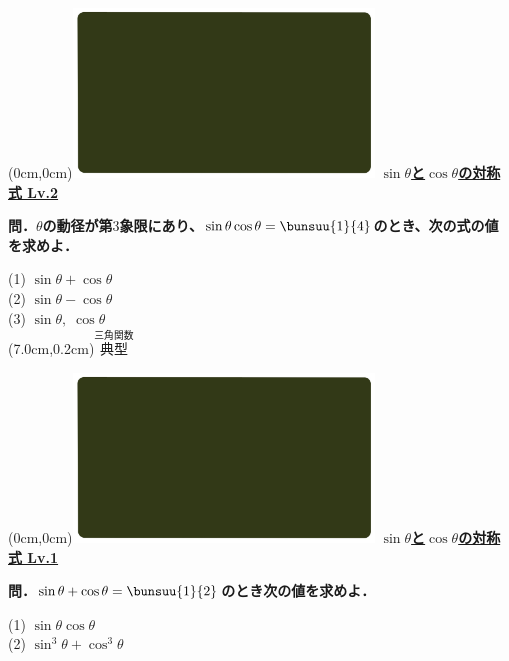 \documentclass[10pt,
fleqn,
dvipdfmx,
uplatex
]{jsarticle}
\begin{document}
\newpage



\at(0cm,0cm){\includegraphics[width=8cm,bb=0 0 1920 1080]{./youtube/thumbnails/templates/smart_background/三角関数.jpeg}}
{\color{orange}\bf\boldmath\Large\underline{$\sin \theta$と$\cos \theta$の対称式 Lv.2}}\vspace{0.1zw}

\normalsize 
\bf\boldmath 問．$\theta$の動径が第$3$象限にあり、$\sin \theta \cos \theta =\bunsuu{1}{4}$のとき、次の式の値を求めよ．

\Large
\vspace{-0.1zw}
(1)  $\sin \theta +\cos \theta$\vspace{-0.1zw}\\
(2)  $\sin \theta -\cos \theta$\vspace{-0.1zw}\\
(3)  $\sin \theta ,\;\cos \theta$\\

\at(7.0cm,0.2cm){\small\color{bradorange}$\overset{\text{三角関数}}{\text{典型}}$}


\newpage



\at(0cm,0cm){\includegraphics[width=8cm,bb=0 0 1920 1080]{./youtube/thumbnails/templates/smart_background/三角関数.jpeg}}
{\color{orange}\bf\boldmath\Large\underline{$\sin \theta$と$\cos \theta$の対称式 Lv.1}}\vspace{0.3zw}

\normalsize
\bf\boldmath 問．$\sin \theta +\cos \theta =\bunsuu{1}{2}$のとき次の値を求めよ．

\huge
\vspace{0.2zw}
(1)  $\sin \theta \cos \theta$\\
(2)  $\sin ^3\theta +\cos ^3\theta$\\
\end{document}
